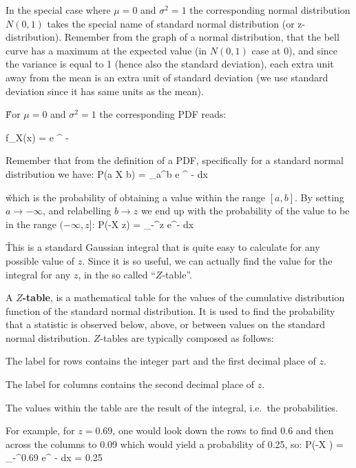 In the special case where $\mu=0$ and $\sigma^2=1$ the corresponding normal distribution $N(0,1)$ takes the special
name of standard normal distribution (or z-distribution). Remember from the graph of a normal distribution, that the
bell curve has a maximum at the expected value (in $N(0,1)$ case at 0), and since the variance is equal to 1 (hence
also the standard deviation), each extra unit away from the mean is an extra unit of standard deviation (we use
standard deviation since it has same units as the mean).

\v
For $\mu=0$ and $\sigma^2=1$ the corresponding PDF reads:

\bse
f_{X}(x) =  e ^ {-}
\ese
\ed

Remember that from the definition of a PDF, specifically for a standard normal distribution we have:
\bse
P(a \leq X \leq b) =  \int_{a}^{b} e ^ {-} dx
\ese

\v

which is the probability of obtaining a value within the range $[a,b]$. By setting $a \to -\infty$, and relabelling
$b \to z$ we end up with the probability of the value to be in the range $ (-\infty, z]$:
\bse
P(-\infty \leq X \leq z) =  \int_{-\infty}^{z} e^{-} dx
\ese

\v

This is a standard Gaussian integral that is quite easy to calculate for any possible value of $z$. Since it is so
useful, we can actually find the value for the integral for any $z$, in the so called ``$Z$-table''.

\bd[$Z$-Table]
A \textbf{$Z$-table}, is a mathematical table for the values of the cumulative distribution function of the standard
normal distribution. It is used to find the probability that a statistic is observed below, above, or between values
on the standard normal distribution. $Z$-tables are typically composed as follows:
\bit
\item The label for rows contains the integer part and the first decimal place of $z$.
\item The label for columns contains the second decimal place of $z$.
\item The values within the table are the result of the integral, i.e.\ the probabilities.
\eit
\ed

For example, for $z=0.69$, one would look down the rows to find 0.6 and then across the columns to 0.09 which would
yield a probability of 0.25, so:
\bse
P(-\infty \leq X ) =  \int_{-\infty}^{0.69} e^ {-} dx = 0.25
\ese

